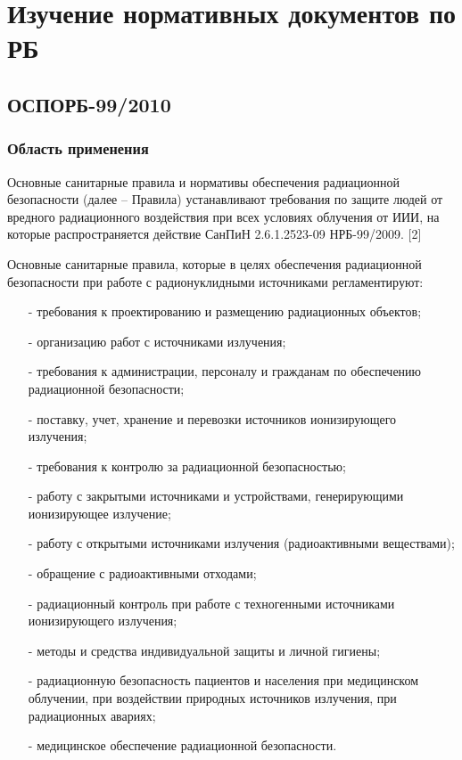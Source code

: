 \chapter{Изучение нормативных документов по РБ} \label{chap1}
\section{ОСПОРБ-99/2010} \label{sect1_1}
\subsection{Область применения} \label{subsect1_1_1}
    Основные санитарные правила и нормативы обеспечения радиационной 
    безопасности (далее -- Правила) устанавливают требования по защите 
    людей от вредного радиационного воздействия при всех условиях 
    облучения от ИИИ, на которые распространяется действие СанПиН 
    2.6.1.2523-09 НРБ-99/2009. [2]

    Основные санитарные правила, которые в целях обеспечения радиационной 
    безопасности при работе с радионуклидными источниками регламентируют:
    \begin{itemize}
    	\item[-] требования к проектированию и размещению радиационных 
    		объектов;
		\item[-] организацию работ с источниками излучения;
		\item[-] требования к администрации, персоналу и гражданам по 
			обеспечению радиационной безопасности;
		\item[-] поставку, учет, хранение и перевозки источников 
			ионизирующего излучения;
		\item[-] требования к контролю за радиационной безопасностью;
		\item[-] работу с закрытыми источниками и устройствами, генерирующими 
			ионизирующее излучение;
		\item[-] работу с открытыми источниками излучения (радиоактивными 
			веществами);
		\item[-] обращение с радиоактивными отходами;
		\item[-] радиационный контроль при работе с техногенными источниками 
			ионизирующего излучения;
		\item[-] методы и средства индивидуальной защиты и личной гигиены;
		\item[-] радиационную безопасность пациентов и населения при 
			медицинском облучении, при воздействии природных источников 
			излучения, при радиационных авариях;
		\item[-] медицинское обеспечение радиационной безопасности.
    \end{itemize}

